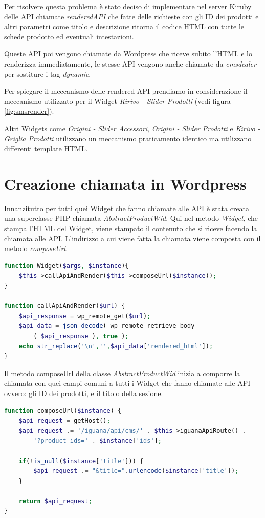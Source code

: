 Per risolvere questa problema è stato deciso di implementare nel server Kiruby delle API chiamate
\emph{renderedAPI} che fatte delle richieste con gli ID dei prodotti e altri parametri come titolo e descrizione
ritorna il codice HTML con tutte le schede prodotto ed eventuali intestazioni.

Queste API poi vengono chiamate da Wordpress che riceve subito l'HTML e lo renderizza immediatamente,
le stesse API vengono anche chiamate da \emph{cmsdealer} per sostiture i tag \emph{dynamic}.

Per spiegare il meccanismo delle rendered API prendiamo in considerazione il meccanismo utilizzato per il Widget
\emph{Kirivo - Slider Prodotti} (vedi figura \ref{fig:smsrender}).

Altri Widgets come \emph{Origini - Slider Accessori}, \emph{Origini - Slider Prodotti} e \emph{Kirivo - Griglia Prodotti}
utilizzano un meccanismo praticamento identico ma utilizzano differenti template HTML.

\section{Creazione chiamata in Wordpress}
Innanzitutto per tutti quei Widget che fanno chiamate alle API è stata creata una superclasse PHP chiamata
\emph{AbstractProductWid}.
Qui nel metodo \emph{Widget}, che stampa l'HTML del Widget, viene stampato il contenuto che si riceve facendo la chiamata alle
API. L'indirizzo a cui viene fatta la chiamata viene composta con il metodo \emph{composeUrl}.

\begin{lstlisting}[style=customphp, language=Php,caption={I metodi Widget e \emph{callApiAndRender} di \emph{AbstractProductWid}}] 
function Widget($args, $instance){
	$this->callApiAndRender($this->composeUrl($instance));
}

function callApiAndRender($url) {
	$api_response = wp_remote_get($url);
	$api_data = json_decode( wp_remote_retrieve_body
		( $api_response ), true );
	echo str_replace('\n','',$api_data['rendered_html']);
}
\end{lstlisting}

Il metodo composeUrl della classe \emph{AbstractProductWid} inizia a comporre la chiamata con quei campi
comuni a tutti i Widget che fanno chiamate alle API ovvero: gli ID dei prodotti, e il titolo della sezione.

\begin{lstlisting}[style=customphp, language=Php,caption={Il metodo \emph{composeUrl} di \emph{AbstractProductWid}}] 
function composeUrl($instance) {
    $api_request = getHost();
    $api_request .= '/iguana/api/cms/' . $this->iguanaApiRoute() . 
    	'?product_ids=' . $instance['ids'];

    if(!is_null($instance['title'])) {
        $api_request .= "&title=".urlencode($instance['title']);
    }

    return $api_request;
}

\end{lstlisting}

